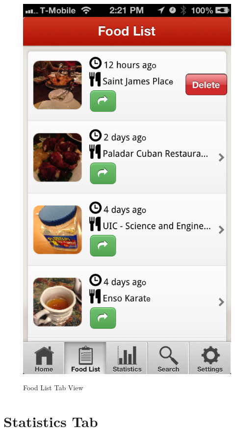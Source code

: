 \begin{figure}
{	\includegraphics[width=\figwidth, totalheight=\figheight, keepaspectratio]{./screenshots/foodlist-delete.png}} \hfill
	\caption{Food List Tab View}
	\label{fig:foodielisttab}
\end{figure}


\section{Statistics Tab} %
\label{sec:stats_tab}

